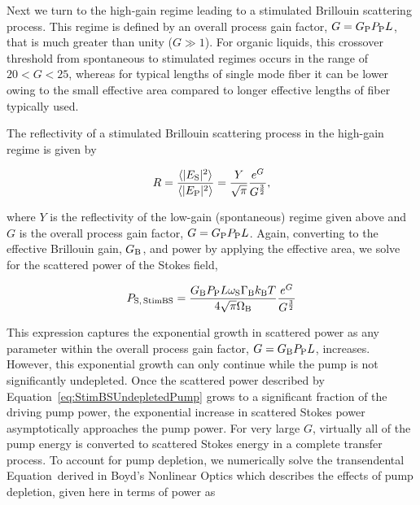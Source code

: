 Next we turn to the high-gain regime leading to a stimulated Brillouin scattering process. This regime is defined by an overall process gain factor, \(G = G_{\rm P}P_{\rm P}L\), that is much greater than unity (\(G \gg 1\)). For organic liquids, this crossover threshold from spontaneous to stimulated regimes occurs in the range of \(20 < G < 25\), \cite{boyd1990noise} whereas for typical lengths of single mode fiber it can be lower \cite{ippen1972stimulated} owing to the small effective area compared to longer effective lengths of fiber typically used.

The reflectivity of a stimulated Brillouin scattering process in the high-gain regime is given by \cite{boyd1990noise}

\begin{equation}
  R = \frac{\langle|E_{\rm S}|^{2}\rangle}{\langle|E_{\rm P}|^{2}\rangle} = \frac{Y}{\sqrt{\pi}}\frac{e^{G}}{G^{\frac{3}{2}}},
\end{equation}

where \(Y\) is the reflectivity of the low-gain (spontaneous) regime given above and \(G\) is the overall process gain factor, \(G = G_{\rm P}P_{\rm P}L\). Again, converting to the effective Brillouin gain, \(G_{\rm B}\), and power by applying the effective area, we solve for the scattered power of the Stokes field,

\begin{equation}
  P_{\rm S,\,StimBS} = \frac{G_{\rm B}P_{\rm P}L\omega_{\rm S}\Gamma_{\rm B}k_{\rm B}T}{4\sqrt{\pi}\Omega_{\rm B}}\frac{e^{G}}{G^{\frac{3}{2}}}
  \label{eq:StimBSUndepletedPump}
\end{equation}

This expression captures the exponential growth in scattered power as any parameter within the overall process gain factor, \(G = G_{\rm B}P_{\rm P}L\), increases. However, this exponential growth can only continue while the pump is not significantly undepleted. Once the scattered power described by Equation~\ref{eq:StimBSUndepletedPump} grows to a significant fraction of the driving pump power, the exponential increase in scattered Stokes power asymptotically approaches the pump power. For very large \(G\), virtually all of the pump energy is converted to scattered Stokes energy in a complete transfer process.\cite{boyd2020nonlinear} To account for pump depletion, we numerically solve the transendental Equation~derived in Boyd's Nonlinear Optics which describes the effects of pump depletion, given here in terms of power as

